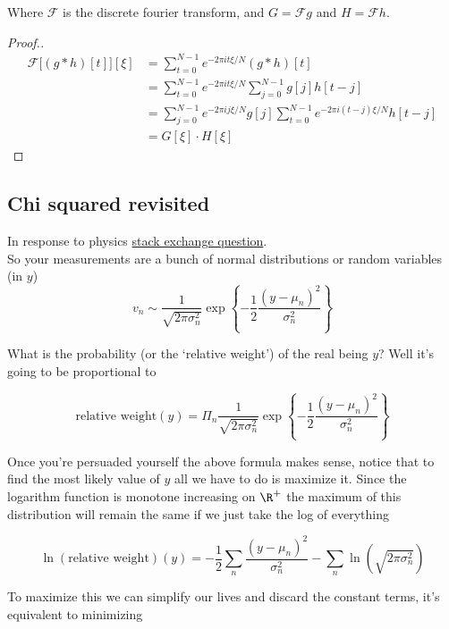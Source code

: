 \documentclass[12pt]{article}
\begin{document}
Where $\mathcal F$ is the discrete fourier transform, and $G=\mathcal F g$ and $H =\mathcal F h$.

\begin{proof}[Proof.]

$$\begin{aligned}\mathcal F\big[(g\ast h)[t]\big][\xi] 
    &= \sum_{t=0}^{N-1} e^{-2\pi i t\xi/N} (g\ast h)[t]\\
    &= \sum_{t=0}^{N-1} e^{-2\pi i t\xi /N} \sum_{j=0}^{N-1}g[j] h[t-j]\\
    &= \sum_{j=0}^{N-1}e^{-2\pi i j\xi /N} g[j] \sum_{t=0}^{N-1} e^{-2\pi i(t-j)\xi /N} h[t-j]\\
    &= G[\xi]\cdot H[\xi]
\end{aligned}$$

\end{proof}

\subsection{Chi squared revisited}


In response to physics \href{https://physics.stackexchange.com/questions/57317/multiple-measurements-of-the-same-quantity-combining-uncertainties/57326\#57326?newreg=3debd4f5c72045ddbd37ad0b0652958b}{stack exchange question}. \\

So your measurements are a bunch of normal distributions or random variables (in $y$) $$v_n \sim \frac{1}{\sqrt{2\pi \sigma_n^2}} \exp\left\{ -\frac{1}{2}\frac{(y - \mu_n)^2}{\sigma_n^2} \right\}$$

What is the probability (or the `relative weight') of the real being $y$? Well it's going to be proportional to

$$\text{relative weight}(y) = \Pi_n \frac{1}{\sqrt{2\pi \sigma_n^2}} \exp\left\{ -\frac{1}{2}\frac{(y - \mu_n)^2}{\sigma_n^2} \right\}$$

Once you're persuaded yourself the above formula makes sense, notice that to find the most likely value of $y$ all we have to do is maximize it. Since the logarithm function is monotone increasing on $\R^+$ the maximum of this distribution will remain the same if we just take the log of everything

$$\ln(\text{relative weight})(y) = -\frac{1}{2}\sum_n\frac{(y-\mu_n)^2}{\sigma_n^2} - \sum_n \ln(\sqrt{2\pi \sigma_n^2})$$

To maximize this we can simplify our lives and discard the constant terms, it's equivalent to minimizing 
\end{document}
